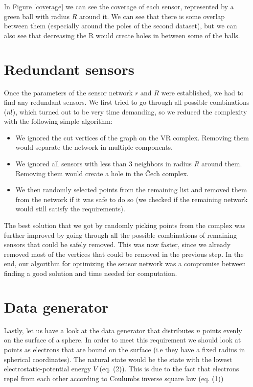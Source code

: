 \documentclass[a4paper, 12pt]{article}
\begin{document}
In Figure \ref{coverage} we can see the coverage of each sensor, represented by a green ball with radius $R$ around it. We can see that there is some overlap between them (especially around the poles of the second dataset), but we can also see that decreasing the R would create holes in between some of the balls.


\section{Redundant sensors}
Once the parameters of the sensor network $r$ and $R$ were established, we had to find any redundant sensors. We first tried to go through all possible combinations ($n!$), which turned out to be very time demanding, so we reduced the complexity with the following simple algorithm:
\begin{itemize}
	\item We ignored the cut vertices of the graph on the VR complex. Removing them would separate the network in multiple components.
	\item We ignored all sensors with less than 3 neighbors in radius $R$ around them. Removing them would create a hole in the Čech complex.
	\item We then randomly selected points from the remaining list and removed them from the network if it was safe to do so (we checked if the remaining network would still satisfy the requirements).
\end{itemize}

The best solution that we got by randomly picking points from the complex was further improved by going through all the possible combinations of remaining sensors that could be safely removed. This was now faster, since we already removed most of the vertices that could be removed in the previous step. In the end, our algorithm for optimizing the sensor network was a compromise between finding a good solution and time needed for computation.


\section{Data generator}
Lastly, let us have a look at the data generator that distributes $n$ points evenly on the surface of a sphere. In order to meet this requirement we should look at points as electrons that are bound on the surface (i.e they have a fixed radius in spherical coordinates). The natural state would be the state with the lowest electrostatic-potential energy $V$ (eq. (2)). This is due to the fact that electrons repel from each other according to Coulumbs inverse square law (eq. (1))
\end{document}
